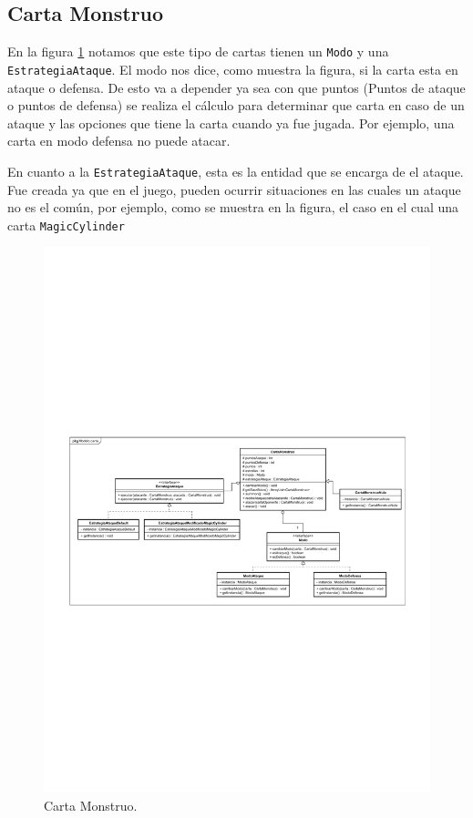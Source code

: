 	\subsection{Carta Monstruo}
	
	En la figura \ref{class_CartaMonstruo} notamos que este tipo de cartas tienen un \texttt{Modo} y una \texttt{EstrategiaAtaque}. El modo nos dice, como muestra la figura, si la carta esta en ataque o defensa. De esto va a depender ya sea con que puntos (Puntos de ataque o puntos de defensa) se realiza el cálculo para determinar que carta  en caso de un ataque y las opciones que tiene la carta cuando ya fue jugada. Por ejemplo, una carta en modo defensa no puede atacar.
	
	En cuanto a la \texttt{EstrategiaAtaque}, esta es la entidad que se encarga de  el ataque. Fue creada ya que en el juego, pueden ocurrir situaciones en las cuales un ataque no es el común, por ejemplo, como se muestra en la figura, el caso en el cual una carta \texttt{MagicCylinder}
	
	
	\begin{figure}[H]
		\centering
		\includegraphics[scale=0.8]{includes/class_CartaMonstruo}
		\caption{Carta Monstruo.}
		\label{class_CartaMonstruo}
	\end{figure}
	
